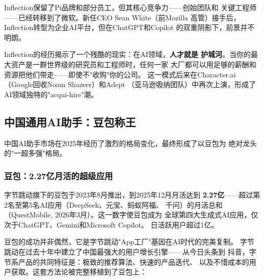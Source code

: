 Inflection保留了Pi品牌和部分员工，但其核心竞争力——创始团队和
关键工程师——已经转移到了微软。新任CEO Sean White（前Mozilla
高管）接手后，Inflection转型为企业AI平台，但在ChatGPT和Copilot
的双重阴影下，前景并不明朗。

Inflection的经历揭示了一个残酷的现实：在AI领域，\textbf{人才就是
护城河}。当你的最大资产是一群世界级的研究员和工程师时，任何一家
大厂都可以用足够的薪酬和资源把他们带走——即使不"收购"你的公司。
这一模式后来在Character.ai（Google回收Noam Shazeer）和Adept
（亚马逊吸纳团队）中再次上演，形成了AI领域独特的"acqui-hire"潮。

\subsection{中国通用AI助手：豆包称王}
\label{subsec:china-assistants}

中国AI助手市场在2025年经历了激烈的格局变化，最终形成了以豆包为
绝对龙头的"一超多强"格局。

\subsubsection{豆包：2.27亿月活的超级应用}

字节跳动旗下的豆包于2023年8月推出，到2025年12月月活达到
\textbf{2.27亿}——超过第2名至第5名AI应用（DeepSeek、元宝、蚂蚁阿福、
千问）的月活总和（QuestMobile, 2026年3月）。这一数字使豆包成为
全球第四大生成式AI应用，仅次于ChatGPT、Gemini和Microsoft Copilot。
日活跃用户超过1亿。

豆包的成功并非偶然，它是字节跳动"App工厂"基因在AI时代的完美复制。
字节跳动在过去十年中建立了中国最强大的用户增长引擎——从今日头条到
抖音，字节系产品的共同特征是：极致的推荐算法、快速的产品迭代、
以及不惜成本的用户获取。这套方法论被完整移植到了豆包上：

